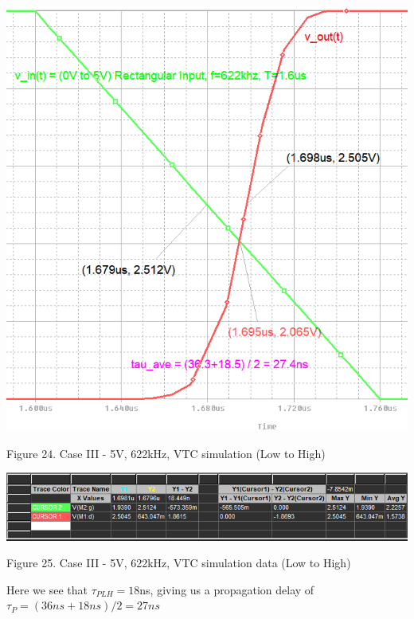 \documentclass[conference]{IEEEtran}
\begin{document}
\begin{center}
    \centerline{\includegraphics[scale = 0.48]{figures/case3_results_LH.png}}
    Figure 24. Case III - 5V, 622kHz, VTC simulation (Low to High)
\end{center} 

\begin{center}
    \centerline{\includegraphics[scale = 0.5]{figures/case3_results_LH_data.png}}
    Figure 25. Case III - 5V, 622kHz, VTC simulation data (Low to High)
\end{center}

Here we see that $\tau_{PLH} = 18$ns, giving us a propagation delay of 
$\tau_P = (36ns + 18ns)/2 = 27ns$
\end{document}
